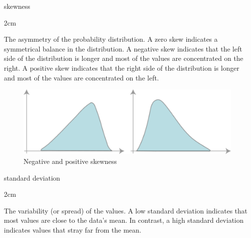 \documentclass[
]{book}
\newenvironment{glsentry}
  {
  \begin{minipage}{\textwidth}
  }
  {
  \end{minipage}
  }
\newenvironment{glsterm}
  {
  \bfseries
  }
  {
  }
\newenvironment{glsdef}
  {
  \noindent
  \flushleft
  \begin{adjustwidth}{2cm}{}
  }
  {
  \end{adjustwidth}
  }
\theoremstyle{definition}
\theoremstyle{definition}
\theoremstyle{definition}
\theoremstyle{definition}
\theoremstyle{remark}
\begin{document}
\begin{glsentry}

\begin{glsterm}
skewness

\end{glsterm}

\begin{glsdef}

The asymmetry of the probability distribution. A zero skew indicates a symmetrical balance in the distribution. A negative skew indicates that the left side of the distribution is longer and most of the values are concentrated on the right. A positive skew indicates that the right side of the distribution is longer and most of the values are concentrated on the left.

\begin{figure}[H]

{\centering \includegraphics[width=6.94in,]{Images/NonGenerated/Skewness} 

}

\caption{Negative and positive skewness}\label{fig:unnamed-chunk-133}
\end{figure}

\end{glsdef}

\end{glsentry}

\begin{glsentry}

\begin{glsterm}
standard deviation

\end{glsterm}

\begin{glsdef}
The variability (or spread) of the values. A low standard deviation indicates that most values are close to the data's mean. In contrast, a high standard deviation indicates values that stray far from the mean.

\end{glsdef}

\end{glsentry}
\end{document}
